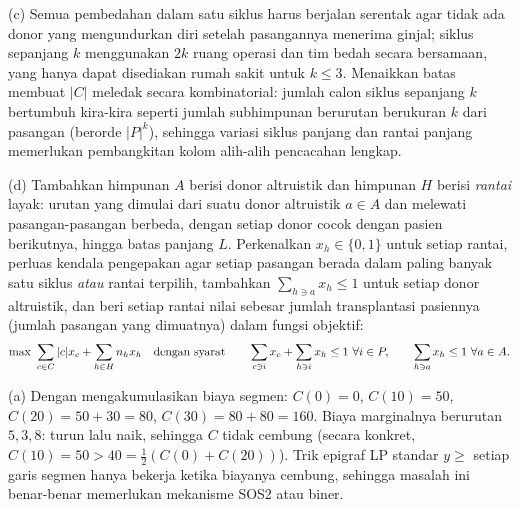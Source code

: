 (c) Semua pembedahan dalam satu siklus harus berjalan serentak agar tidak ada donor yang mengundurkan diri setelah pasangannya menerima ginjal; siklus sepanjang $k$ menggunakan $2k$ ruang operasi dan tim bedah secara bersamaan, yang hanya dapat disediakan rumah sakit untuk $k \leq 3$. Menaikkan batas membuat $|C|$ meledak secara kombinatorial: jumlah calon siklus sepanjang $k$ bertumbuh kira-kira seperti jumlah subhimpunan berurutan berukuran $k$ dari pasangan (berorde $|P|^k$), sehingga variasi siklus panjang dan rantai panjang memerlukan pembangkitan kolom alih-alih pencacahan lengkap.

(d) Tambahkan himpunan $A$ berisi donor altruistik dan himpunan $H$ berisi \emph{rantai} layak: urutan yang dimulai dari suatu donor altruistik $a \in A$ dan melewati pasangan-pasangan berbeda, dengan setiap donor cocok dengan pasien berikutnya, hingga batas panjang $L$. Perkenalkan $x_h \in \{0,1\}$ untuk setiap rantai, perluas kendala pengepakan agar setiap pasangan berada dalam paling banyak satu siklus \emph{atau} rantai terpilih, tambahkan $\sum_{h \ni a} x_h \leq 1$ untuk setiap donor altruistik, dan beri setiap rantai nilai sebesar jumlah transplantasi pasiennya (jumlah pasangan yang dimuatnya) dalam fungsi objektif:
\[
\max\ \sum_{c \in C} |c|x_c + \sum_{h \in H} n_h x_h
\quad \mbox{dengan syarat}\quad\quad
\sum_{c \ni i} x_c + \sum_{h \ni i} x_h \leq 1 \ \forall i \in P,\qquad
\sum_{h \ni a} x_h \leq 1 \ \forall a \in A.
\]


(a) Dengan mengakumulasikan biaya segmen: $C(0) = 0$, $C(10) = 50$, $C(20) = 50 + 30 = 80$, $C(30) = 80 + 80 = 160$. Biaya marginalnya berurutan $5, 3, 8$: turun lalu naik, sehingga $C$ tidak cembung (secara konkret, $C(10) = 50 > 40 = \tfrac{1}{2}(C(0) + C(20))$). Trik epigraf LP standar $y \geq$ setiap garis segmen hanya bekerja ketika biayanya cembung, sehingga masalah ini benar-benar memerlukan mekanisme SOS2 atau biner.

